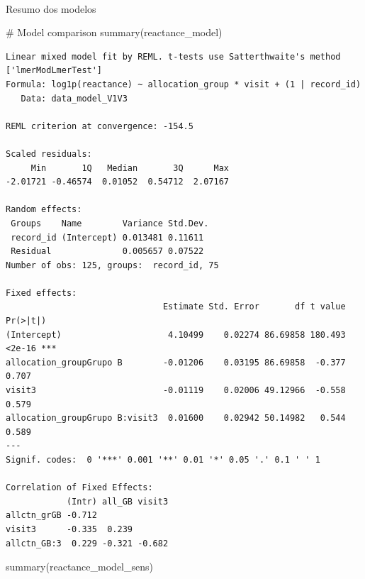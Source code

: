 \documentclass[
  12pt,
]{article}
\makeatletter
\let\oldparagraph\paragraph
\renewcommand{\paragraph}{
    \@ifstar
      \xxxParagraphStar
      \xxxParagraphNoStar
  }
\newcommand{\xxxParagraphStar}[1]{\oldparagraph*{#1}\mbox{}}
\newcommand{\xxxParagraphNoStar}[1]{\oldparagraph{#1}\mbox{}}
\newenvironment{Shaded}{\begin{snugshade}}{\end{snugshade}}
\newcommand{\CommentTok}[1]{\textcolor[rgb]{0.37,0.37,0.37}{#1}}
\newcommand{\FunctionTok}[1]{\textcolor[rgb]{0.28,0.35,0.67}{#1}}
\newcommand{\NormalTok}[1]{\textcolor[rgb]{0.00,0.23,0.31}{#1}}
\makeatother
\begin{document}
\paragraph{Resumo dos modelos}\label{resumo-dos-modelos-18}

\begin{Shaded}
\begin{Highlighting}[]
\CommentTok{\# Model comparison}
\FunctionTok{summary}\NormalTok{(reactance\_model)}
\end{Highlighting}
\end{Shaded}

\begin{verbatim}
Linear mixed model fit by REML. t-tests use Satterthwaite's method ['lmerModLmerTest']
Formula: log1p(reactance) ~ allocation_group * visit + (1 | record_id)
   Data: data_model_V1V3

REML criterion at convergence: -154.5

Scaled residuals: 
     Min       1Q   Median       3Q      Max 
-2.01721 -0.46574  0.01052  0.54712  2.07167 

Random effects:
 Groups    Name        Variance Std.Dev.
 record_id (Intercept) 0.013481 0.11611 
 Residual              0.005657 0.07522 
Number of obs: 125, groups:  record_id, 75

Fixed effects:
                               Estimate Std. Error       df t value Pr(>|t|)    
(Intercept)                     4.10499    0.02274 86.69858 180.493   <2e-16 ***
allocation_groupGrupo B        -0.01206    0.03195 86.69858  -0.377    0.707    
visit3                         -0.01119    0.02006 49.12966  -0.558    0.579    
allocation_groupGrupo B:visit3  0.01600    0.02942 50.14982   0.544    0.589    
---
Signif. codes:  0 '***' 0.001 '**' 0.01 '*' 0.05 '.' 0.1 ' ' 1

Correlation of Fixed Effects:
            (Intr) all_GB visit3
allctn_grGB -0.712              
visit3      -0.335  0.239       
allctn_GB:3  0.229 -0.321 -0.682
\end{verbatim}

\begin{Shaded}
\begin{Highlighting}[]
\FunctionTok{summary}\NormalTok{(reactance\_model\_sens)}
\end{Highlighting}
\end{Shaded}
\end{document}
